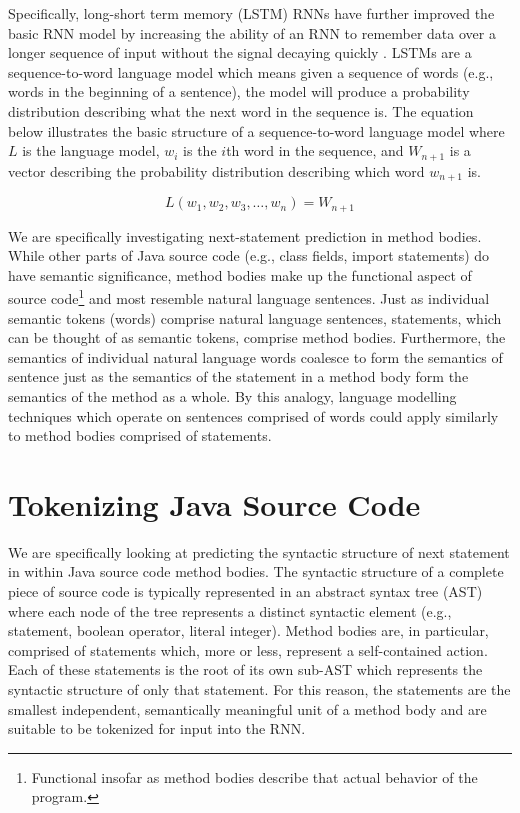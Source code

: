 \documentclass{article}
\begin{document}
Specifically, long-short term memory (LSTM) RNNs have further improved
the basic RNN model by increasing the ability of an RNN to remember
data over a longer sequence of input without the signal decaying
quickly \cite{LSTMArticle}. LSTMs are a sequence-to-word language
model which means given a sequence of words (e.g., words in the
beginning of a sentence), the model will produce a probability
distribution describing what the next word in the sequence is.
The equation below illustrates the basic structure of a
sequence-to-word language model where $L$ is the language model,
$w_i$ is the $i$th word in the sequence, and $W_{n+1}$ is a vector
describing the probability distribution describing which word $w_{n+1}$
is.

\begin{equation}
\label{seqtoword}
    L(w_1, w_2, w_3, \dots, w_n) = W_{n+1}
\end{equation}

We are specifically investigating next-statement prediction in method
bodies. While other parts of Java source code (e.g., class fields,
import statements) do have semantic significance, method bodies make up
the functional aspect of source code\footnote{
Functional insofar as method bodies describe that actual
behavior of the program.} and most resemble natural language sentences.
Just as individual semantic tokens (words) comprise natural language
sentences, statements, which can be thought of as semantic tokens,
comprise method bodies. Furthermore, the semantics of individual natural
language words coalesce to form the semantics of sentence just as the
semantics of the statement in a method body form the semantics of the
method as a whole. By this analogy, language modelling techniques which
operate on sentences comprised of words could apply similarly to method
bodies comprised of statements.



\section{Tokenizing Java Source Code}

We are specifically looking at predicting the syntactic structure  of next 
statement in within Java source code method bodies. The syntactic structure 
of a complete piece of source code is typically represented in an abstract 
syntax tree (AST) where each node of the tree represents a distinct 
syntactic element (e.g., statement, boolean operator, literal integer). 
Method bodies are, in particular, comprised of statements which, more or 
less, represent a self-contained action. Each of these statements is the 
root of its own sub-AST which represents the syntactic structure of only 
that statement. For this reason, the statements are the smallest 
independent, semantically meaningful unit of a method body and are suitable 
to be tokenized for input into the RNN.
\end{document}
